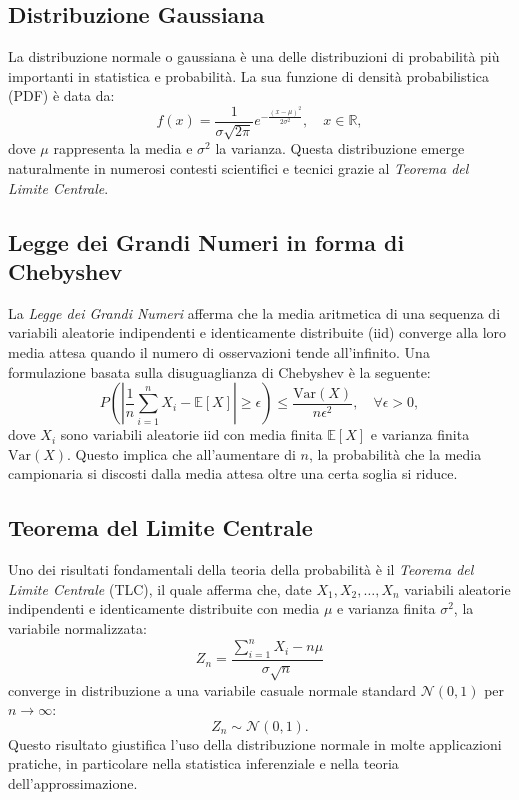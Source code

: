 \subsection{Distribuzione Gaussiana}
La distribuzione normale o gaussiana è una delle distribuzioni di probabilità più importanti 
in statistica e probabilità. La sua funzione di densità probabilistica (PDF) è data da:
\begin{equation}
    f(x) = \frac{1}{\sigma \sqrt{2\pi}} e^{-\frac{(x - \mu)^2}{2 \sigma^2}}, \quad x \in \mathbb{R},
\end{equation}
dove $\mu$ rappresenta la media e $\sigma^2$ la varianza.
Questa distribuzione emerge naturalmente in numerosi contesti scientifici e 
tecnici grazie al \textit{Teorema del Limite Centrale}.

\subsection{Legge dei Grandi Numeri in forma di Chebyshev}
La \textit{Legge dei Grandi Numeri} afferma che la media aritmetica di una sequenza di variabili aleatorie indipendenti
 e identicamente distribuite (iid) converge alla loro media attesa quando il numero di osservazioni tende all'infinito. 
 Una formulazione basata sulla disuguaglianza di Chebyshev è la seguente:
\begin{equation}
    P\left( \left| \frac{1}{n} \sum_{i=1}^{n} X_i - \mathbb{E}[X] \right| \geq \epsilon \right) \leq \frac{\text{Var}(X)}{n \epsilon^2}, \quad \forall \epsilon > 0,
\end{equation}
dove $X_i$ sono variabili aleatorie iid
con media finita $\mathbb{E}[X]$ e varianza finita $\text{Var}(X)$.
 Questo implica che all'aumentare di $n$, la probabilità che la media campionaria si discosti dalla media 
 attesa oltre una certa soglia si riduce.

\subsection{Teorema del Limite Centrale}
Uno dei risultati fondamentali della teoria della probabilità è il \textit{Teorema del Limite Centrale} (TLC), 
il quale afferma che, date $X_1, X_2, \dots, X_n$ variabili aleatorie indipendenti e identicamente distribuite 
con media $\mu$ e varianza finita $\sigma^2$, la variabile normalizzata:
\begin{equation}
    Z_n = \frac{\sum_{i=1}^{n} X_i - n\mu}{\sigma \sqrt{n}}
\end{equation}
converge in distribuzione a una variabile casuale normale standard $\mathcal{N}(0,1)$ per $n \to \infty$:
\begin{equation}
    Z_n \sim \mathcal{N}(0,1).
\end{equation}
Questo risultato giustifica l'uso della distribuzione normale in molte applicazioni pratiche, in particolare nella statistica inferenziale e nella teoria dell'approssimazione.